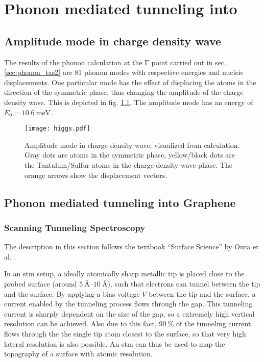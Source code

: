 \documentclass[main.tex]{subfiles}
\begin{document}
\chapter{Phonon mediated tunneling into \TaS}\label{ch:sts_gap_tas2}

\section{Amplitude mode in \TaS charge density wave}\label{sec:amplitude_mode_tas2}

The results of the phonon calculation at the \(\mathrm{\Gamma}\) point carried out in sec. \ref{sec:phonon_tas2} are 81 phonon modes with respective energies and nucleic displacements.
One particular mode has the effect of displacing the atoms in the direction of the symmetric phase, thus changing the amplitude of the charge density wave.
This is depicted in fig. \ref{fig:amplitude_mode_tas2}.
The amplitude mode has an energy of \(E_0 = \SI{10.6}{\milli\eV}\).

\begin{figure}[b!]
    \centering
    \texttt{[image: higgs.pdf]}
    \caption{Amplitude mode in \TaS charge density wave, visualized from \QE calculation. Gray dots are atoms in the symmetric phase, yellow/black dots are the Tantalum/Sulfur atoms in the charge-density-wave phase. The orange arrows show the displacement vectors.}
    \label{fig:amplitude_mode_tas2}
\end{figure}

\section{Phonon mediated tunneling into Graphene}

\subsection{Scanning Tunneling Spectroscopy}\label{sub:sts}

The description in this section follows the textbook \enquote{Surface Science} by Oura et al. \cite{oura_surface_2003}.


In an \acrshort{stm} setup, a ideally atomically sharp metallic tip is placed close to the probed surface (around \(\SIrange{5}{10}{\angstrom}\)), such that electrons can tunnel between the tip and the surface.
By applying a bias voltage \(V\) between the tip and the surface, a current enabled by the tunneling process flows through the gap.
This tunneling current is sharply dependent on the size of the gap, so a extremely high vertical resolution can be achieved.
Also due to this fact, \(\SI{90}{\percent}\) of the tunneling current flows through the the single tip atom closest to the surface, so that very high lateral resolution is also possible.
An \acrshort{stm} can thus be used to map the topography of a surface with atomic resolution.
\end{document}
